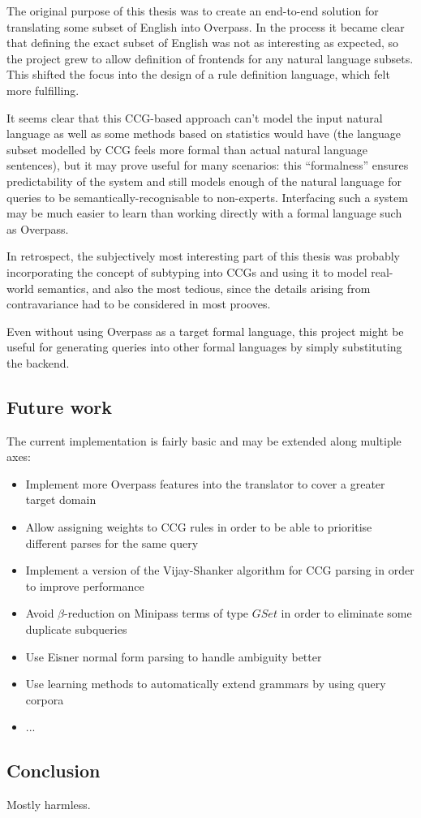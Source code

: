 \documentclass[main.tex]{subfiles}
\begin{document}
The original purpose of this thesis was to create an end-to-end
solution for translating some subset of English into Overpass.
In the process it became clear that defining the exact subset of English
was not as interesting as expected, so the project grew to allow
definition of frontends for any natural language subsets. This shifted the
focus into the design of a rule definition language, which felt more
fulfilling.

It seems clear that this CCG-based approach can't model the input natural
language as well as some methods based on statistics would have
(the language subset modelled by CCG feels more formal than actual
natural language sentences), but it
may prove useful for many scenarios: this ``formalness'' ensures predictability
of the system and still models enough of the natural language for queries
to be semantically-recognisable to non-experts. Interfacing such a system
may be much easier to learn than working directly with a formal language
such as Overpass.

In retrospect, the subjectively most interesting part of this thesis was probably
incorporating the concept of subtyping into CCGs and using it to model
real-world semantics, and also the most tedious, since the details arising
from contravariance had to be considered in most prooves.

Even without using Overpass as a target formal language, this project might be
useful for generating queries into other formal languages by simply
substituting the backend.

\subsection{Future work}
The current implementation is fairly basic and may be extended along multiple
axes:

\begin{itemize}
    \item Implement more Overpass features into the translator to cover a greater
        target domain
    \item Allow assigning weights to CCG rules in order to be able to prioritise
        different parses for the same query
    \item Implement a version of the Vijay-Shanker algorithm for CCG parsing
        in order to improve performance
    \item Avoid $\beta$-reduction on Minipass terms of type $GSet$ in order
        to eliminate some duplicate subqueries
    \item Use Eisner normal form parsing to handle ambiguity better
    \item Use learning methods to automatically extend grammars by using
        query corpora
    \item ...
\end{itemize}

\pagebreak
\subsection{Conclusion}
Mostly harmless.
\end{document}
